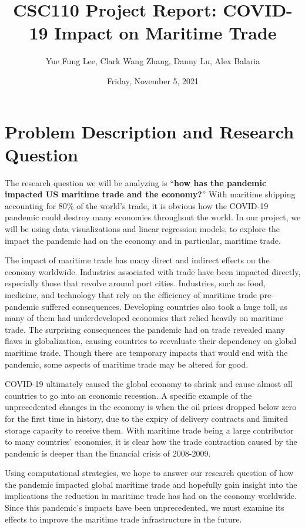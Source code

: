 \documentclass[fontsize=11pt]{article}
\title{CSC110 Project Report: COVID-19 Impact on Maritime Trade}
\author{Yue Fung Lee, Clark Wang Zhang, Danny Lu, Alex Balaria}
\date{Friday, November 5, 2021}
\begin{document}
\maketitle

\section*{Problem Description and Research Question}


The research question we will be analyzing is “\textbf{how has the pandemic impacted US maritime trade and the economy?}” With maritime shipping accounting for 80\% of the world’s trade, it is obvious how the COVID-19 pandemic could destroy many economies throughout the world. In our project, we will be using data visualizations and linear regression models, to explore the impact the pandemic had on the economy and in particular, maritime trade.

The impact of maritime trade has many direct and indirect effects on the economy worldwide. Industries associated with trade have been impacted directly, especially those that revolve around port cities. Industries, such as food, medicine, and technology that rely on the efficiency of maritime trade pre-pandemic suffered consequences. Developing countries also took a huge toll, as many of them had underdeveloped economies that relied heavily on maritime trade. The surprising consequences the pandemic had on trade revealed many flaws in globalization, causing countries to reevaluate their dependency on global maritime trade. Though there are temporary impacts that would end with the pandemic, some aspects of maritime trade may be altered for good. 

COVID-19 ultimately caused the global economy to shrink and cause almost all countries to go into an economic recession. A specific example of the unprecedented changes in the economy is when the oil prices dropped below zero for the first time in history, due to the expiry of delivery contracts and limited storage capacity to receive them. With maritime trade being a large contributor to many countries’ economies, it is clear how the trade contraction caused by the pandemic is deeper than the financial crisis of 2008-2009.

Using computational strategies, we hope to answer our research question of how the pandemic impacted global maritime trade and hopefully gain insight into the implications the reduction in maritime trade has had on the economy worldwide. Since this pandemic’s impacts have been unprecedented, we must examine its effects to improve the maritime trade infrastructure in the future.
\end{document}
